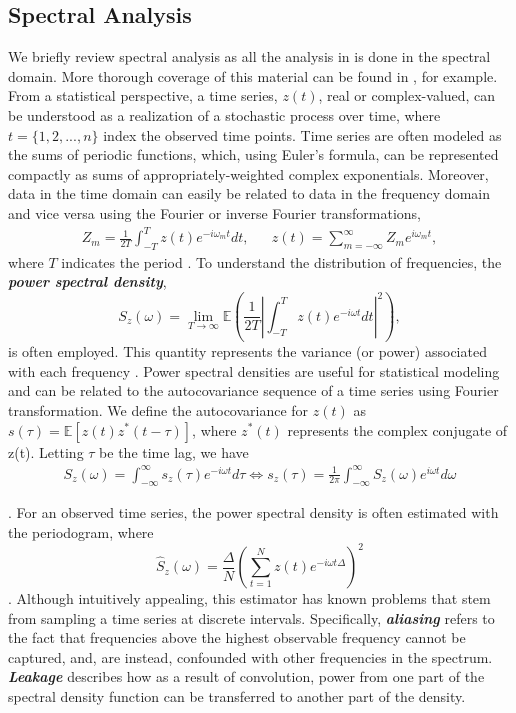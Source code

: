 \documentclass{stat572Style}
\begin{document}
	\subsection{Spectral Analysis}
	\label{sec: specAnalysis}
	\indent We briefly review spectral analysis as all the analysis in \citet{Sykulski2016} is done in the spectral domain.   
	More thorough coverage of this material can be found in  \citet{Percival1993}, for example. 
	From a statistical perspective, a time series, $z(t)$, real or complex-valued,  can be understood as a realization of a stochastic process over time, where  $t = \{1,2,...,n\}$ index the observed time points.  
	Time series are often modeled as the sums of periodic functions, which, using Euler's formula, can be represented compactly as sums of appropriately-weighted complex exponentials. 
	Moreover, data in the time domain can easily be related to data in the frequency domain and vice versa using the Fourier or inverse Fourier transformations,
	\begin{align}
Z_{m} = \frac{1}{2T} \int_{-T}^{T}z(t)e^{-i\omega_{m}t} dt,  && z(t) = \sum_{m=-\infty}^{\infty}Z_{m}e^{i \omega_{m} t},
\end{align}
where $T$ indicates the period \citep{Percival1993}. 
To understand the distribution of frequencies, the \textbf{\it{power spectral density}},
\begin{equation}
S_{z}(\omega) = \underset{T \rightarrow \infty}{\lim} \mathbb{E} \left(\frac{1}{2T} \left| \int_{-T}^{T} z(t) e^{-i \omega t}dt \right|^{2} \right),
\end{equation}
is often employed. 
This quantity represents the variance (or power) associated with each frequency \citep{Percival1993}. 
Power spectral densities are useful for statistical modeling and can be related to the autocovariance sequence of a time series using  Fourier transformation.  
We define the autocovariance  for $z(t)$ as $s(\tau) = \mathbb{E}[z(t) z^{*}(t - \tau)] $, where $z^{*}(t)$ represents the complex conjugate of z(t). Letting $\tau$ be the time lag, we have
\begin{align}
\label{eq: fourierPair}
S_{z}(\omega) = \int_{-\infty}^{\infty}s_{z}(\tau) e^{-i\omega t}d \tau \Longleftrightarrow s_{z}(\tau) = \frac{1}{2\pi} \int_{-\infty}^{\infty}S_{z}(\omega) e^{i \omega t} d\omega 
\end{align}

\noindent \citep{Percival1993}. For an observed time series, the power spectral density is often estimated with the periodogram, where 
\begin{equation}
\label{eq: perio}
\hat{S}_{z}(\omega) = \frac{\Delta}{N} \left( \sum_{t=1}^{N} z(t) e^{-i \omega t \Delta} \right)^{2}
\end{equation}
\citep{Sykulski2013}. 
Although intuitively appealing, this estimator has known problems that stem from  sampling a time series at discrete intervals. 
Specifically, \textbf{\it{aliasing}} refers to the fact that frequencies above the highest observable frequency cannot be captured, and, are instead, confounded with other frequencies in the spectrum.  
\textbf{\it{Leakage}} describes how as a result of convolution, power from one part of the spectral density function can be transferred to another part of the density. 
\end{document}
